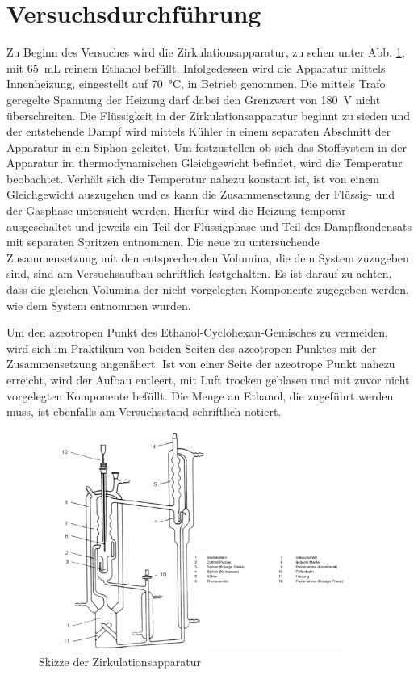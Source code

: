 \newpage
\section{Versuchsdurchführung}
\label{sec:durchfuerung}
Zu Beginn des Versuches wird die Zirkulationsapparatur, zu sehen unter Abb. \ref{fig:aufbau}, mit \SI{65}{\milli \liter} reinem Ethanol befüllt. Infolgedessen wird die Apparatur mittels Innenheizung, eingestellt auf \SI{70}{\celsius}, in Betrieb genommen. Die mittels Trafo geregelte Spannung der Heizung darf dabei den Grenzwert von \SI{180}{\volt} nicht überschreiten. Die Flüssigkeit in der Zirkulationsapparatur beginnt zu sieden und der entstehende Dampf wird mittels Kühler in einem separaten Abschnitt der Apparatur in ein Siphon geleitet. Um festzustellen ob sich das Stoffsystem in der Apparatur im thermodynamischen Gleichgewicht befindet, wird die Temperatur beobachtet. Verhält sich die Temperatur nahezu konstant ist, ist von einem Gleichgewicht auszugehen und es kann die Zusammensetzung der Flüssig- und der Gasphase untersucht werden. Hierfür wird die Heizung temporär ausgeschaltet und jeweils ein Teil der Flüssigphase und Teil des Dampfkondensats mit separaten Spritzen entnommen. Die neue zu untersuchende Zusammensetzung mit den entsprechenden Volumina, die dem System zuzugeben sind, sind am Versuchsaufbau schriftlich festgehalten. Es ist darauf zu achten, dass die gleichen Volumina der nicht vorgelegten Komponente zugegeben werden, wie dem System entnommen wurden.

Um den azeotropen Punkt des Ethanol-Cyclohexan-Gemisches zu vermeiden, wird sich im Praktikum von beiden Seiten des azeotropen Punktes mit der Zusammensetzung angenähert. Ist von einer Seite der azeotrope Punkt nahezu erreicht, wird der Aufbau entleert, mit Luft trocken geblasen und mit zuvor nicht vorgelegten Komponente befüllt. Die Menge an Ethanol, die zugeführt werden muss, ist ebenfalls am Versuchsstand schriftlich notiert.

\begin{figure}[h!]
	\centering
	\includegraphics[width=0.9\textwidth]{img/aufbau}
	\caption{Skizze der Zirkulationsapparatur }
	\label{fig:aufbau}
\end{figure}
\FloatBarrier
